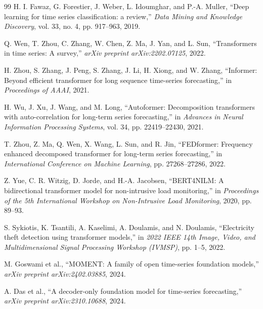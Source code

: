 \documentclass[conference]{IEEEtran}
\begin{document}
\begin{thebibliography}{99}
H. I. Fawaz, G. Forestier, J. Weber, L. Idoumghar, and P.-A. Muller, ``Deep learning for time series classification: a review,'' \textit{Data Mining and Knowledge Discovery}, vol. 33, no. 4, pp. 917--963, 2019.

Q. Wen, T. Zhou, C. Zhang, W. Chen, Z. Ma, J. Yan, and L. Sun, ``Transformers in time series: A survey,'' \textit{arXiv preprint arXiv:2202.07125}, 2022.

H. Zhou, S. Zhang, J. Peng, S. Zhang, J. Li, H. Xiong, and W. Zhang, ``Informer: Beyond efficient transformer for long sequence time-series forecasting,'' in \textit{Proceedings of AAAI}, 2021.

H. Wu, J. Xu, J. Wang, and M. Long, ``Autoformer: Decomposition transformers with auto-correlation for long-term series forecasting,'' in \textit{Advances in Neural Information Processing Systems}, vol. 34, pp. 22419--22430, 2021.

T. Zhou, Z. Ma, Q. Wen, X. Wang, L. Sun, and R. Jin, ``FEDformer: Frequency enhanced decomposed transformer for long-term series forecasting,'' in \textit{International Conference on Machine Learning}, pp. 27268--27286, 2022.

Z. Yue, C. R. Witzig, D. Jorde, and H.-A. Jacobsen, ``BERT4NILM: A bidirectional transformer model for non-intrusive load monitoring,'' in \textit{Proceedings of the 5th International Workshop on Non-Intrusive Load Monitoring}, 2020, pp. 89--93.

S. Sykiotis, K. Tsantili, A. Kaselimi, A. Doulamis, and N. Doulamis, ``Electricity theft detection using transformer models,'' in \textit{2022 IEEE 14th Image, Video, and Multidimensional Signal Processing Workshop (IVMSP)}, pp. 1--5, 2022.

M. Goswami et al., ``MOMENT: A family of open time-series foundation models,'' \textit{arXiv preprint arXiv:2402.03885}, 2024.

A. Das et al., ``A decoder-only foundation model for time-series forecasting,'' \textit{arXiv preprint arXiv:2310.10688}, 2024.

\end{thebibliography}
\end{document}

